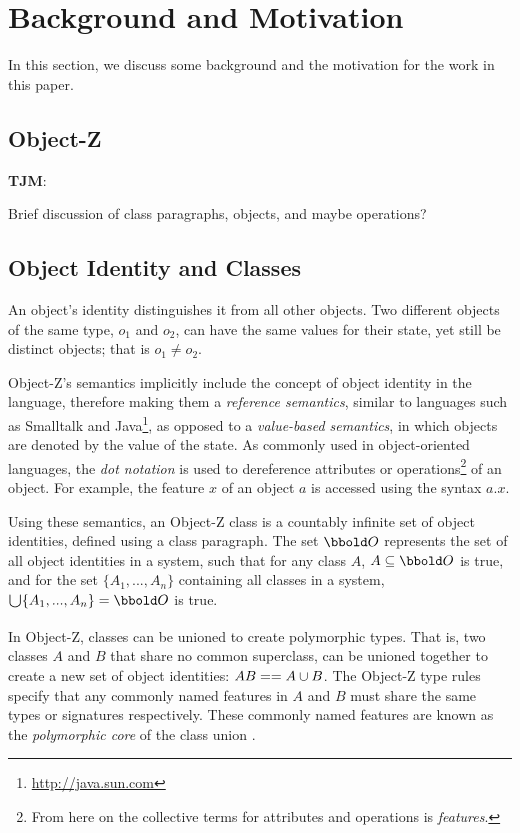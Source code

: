 \section{Background and Motivation}
\label{background}

In this section, we discuss some background and the motivation for the
work in this paper.

\subsection{Object-Z}


{\bf TJM}:

Brief discussion of class paragraphs, objects, and maybe operations?

\subsection{Object Identity and Classes}

An object's identity distinguishes it from all other objects.  Two
different objects of the same type, $o_{1}$ and $o_{2}$, can have the
same values for their state, yet still be distinct objects; that is
$o_{1} \neq o_{2}$.

Object-Z's semantics implicitly include the concept of object identity
in the language, therefore making them a {\em reference semantics},
similar to languages such as Smalltalk \cite{goldberg83} and
Java\footnote{\url{http://java.sun.com}}, as opposed to a {\em
value-based semantics}, in which objects are denoted by the value of
the state. As commonly used in object-oriented languages, the {\em dot
notation} is used to dereference attributes or
operations\footnote{From here on the collective terms for attributes
and operations is {\em features}.} of an object. For example, the
feature $x$ of an object $a$ is accessed using the syntax $a.x$.

Using these semantics, an Object-Z class is a countably infinite set
of object identities, defined using a class paragraph. The set $\oid$
represents the set of all object identities in a system, such that for
any class $A$, $A \subseteq \oid$ is true, and for the set $\{ A_{1},
..., A_{n} \}$ containing all classes in a system, $\duni \{ A_{1},
..., A_{n} \} = \oid$ is true.

In Object-Z, classes can be unioned to create polymorphic types. That
is, two classes $A$ and $B$ that share no common superclass, can be
unioned together to create a new set of object identities: $AB == A
\classuni B$. The Object-Z type rules specify that any commonly named
features in $A$ and $B$ must share the same types or
signatures respectively. These commonly named features are known as
the {\em polymorphic core} of the class union \cite{dong93}.

